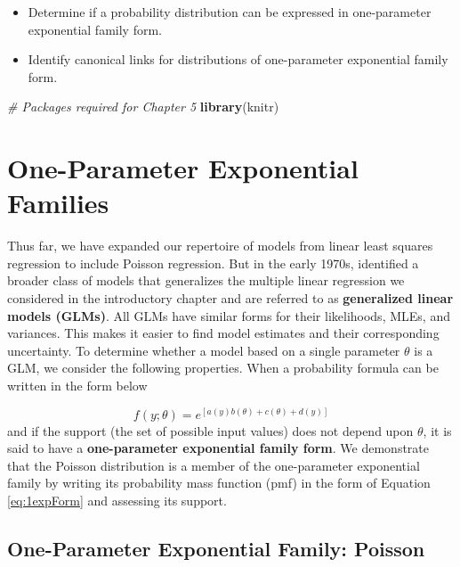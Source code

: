 \documentclass[
]{krantz}
\newenvironment{Shaded}{\begin{snugshade}}{\end{snugshade}}
\newcommand{\CommentTok}[1]{\textcolor[rgb]{0.37,0.37,0.37}{\textit{#1}}}
\newcommand{\FunctionTok}[1]{\textcolor[rgb]{0.27,0.27,0.27}{\textbf{#1}}}
\newcommand{\NormalTok}[1]{#1}
\providecommand{\tightlist}{%
  \setlength{\itemsep}{0pt}\setlength{\parskip}{0pt}}
\begin{document}
\begin{itemize}
\tightlist
\item
  Determine if a probability distribution can be expressed in one-parameter exponential family form.
\item
  Identify canonical links for distributions of one-parameter exponential family form.
\end{itemize}

\begin{Shaded}
\begin{Highlighting}[]
\CommentTok{\# Packages required for Chapter 5}
\FunctionTok{library}\NormalTok{(knitr)}
\end{Highlighting}
\end{Shaded}

\section{One-Parameter Exponential Families}\label{one-parameter-exponential-families}

Thus far, we have expanded our repertoire of models from linear least squares regression to include Poisson regression. But in the early 1970s, \citet{Nelder1972} identified a broader class of models that generalizes the multiple linear regression we considered in the introductory chapter and are referred to as \textbf{generalized linear models (GLMs)}.  All GLMs have similar forms for their likelihoods, MLEs, and variances. This makes it easier to find model estimates and their corresponding uncertainty. To determine whether a model based on a single parameter \(\theta\) is a GLM, we consider the following properties.
When a probability formula can be written in the form below

\begin{equation}
f(y;\theta)=e^{[a(y)b(\theta)+c(\theta)+d(y)]}
\label{eq:1expForm}
\end{equation}
and if the support (the set of possible input values) does not depend upon \(\theta\), it is said to have a \textbf{one-parameter exponential family form}.  We demonstrate that the Poisson distribution is a member of the one-parameter exponential family by writing its probability mass function (pmf) in the form of Equation \eqref{eq:1expForm} and assessing its support.

\subsection{One-Parameter Exponential Family: Poisson}\label{one-parameter-exponential-family-poisson}
\end{document}
